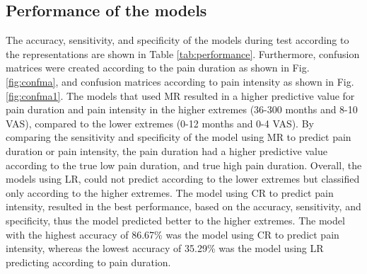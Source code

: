 \subsection{Performance of the models}
The accuracy, sensitivity, and specificity of the models during test according to the representations are shown in Table \ref{tab:performance}. Furthermore, confusion matrices were created according to the pain duration as shown in Fig. \ref{fig:confma}, and confusion matrices according to pain intensity as shown in Fig. \ref{fig:confma1}.
The models that used MR resulted in a higher predictive value for pain duration and pain intensity in the higher extremes (36-300 months and 8-10 VAS), compared to the lower extremes (0-12 months and 0-4 VAS). By comparing the sensitivity and specificity of the model using MR to predict pain duration or pain intensity, the pain duration had a higher predictive value according to the true low pain duration, and true high pain duration.
Overall, the models using LR, could not predict according to the lower extremes but classified only according to the higher extremes.  
The model using CR to predict pain intensity, resulted in the best performance, based on the accuracy, sensitivity, and specificity, thus the model predicted better to the higher extremes. 
The model with the highest accuracy of 86.67\% was the model using CR to predict pain intensity, whereas the lowest accuracy of 35.29\% was the model using LR predicting according to pain duration. 